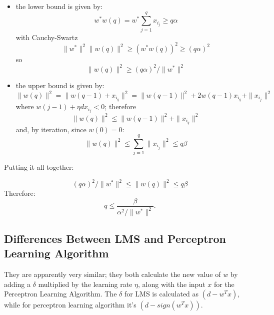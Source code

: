 \begin{itemize}
    \item the lower bound is given by:
    \begin{equation*}
        w^*w(q) = w^* \sum_{j=1}^q x_{i_j} \geq q \alpha
    \end{equation*}
    with Cauchy-Swartz
    \begin{equation*}
        \|w^*\|^2\|w(q)\|^2 \geq (w^*w(q))^2 \geq (q \alpha)^2
    \end{equation*}
    so
    \begin{equation*}
        \|w(q)\|^2 \geq (q \alpha)^2 / \|w^*\|^2
    \end{equation*}

    \item the upper bound is given by:
    \begin{equation*}
        \|w(q)\|^2 = \|w(q-1) + x_{i_q}\|^2 = \|w(q-1)\|^2 + 2w(q-1)x_{i_q} + \|x_{i_j}\|^2
    \end{equation*}
    where $w(j-1) + \eta d x_{i_j} < 0$; therefore
    \begin{equation*}
        \|w(q)\|^2 \leq \|w(q-1)\|^2 + \|x_{i_q}\|^2
    \end{equation*}
    and, by iteration, since $w(0) = 0$:
    \begin{equation*}
        \|w(q)\|^2 \leq \sum_{j=1}^q \|x_{i_j}\|^2 \leq q \beta
    \end{equation*}
    
\end{itemize}

Putting it all together:

\begin{equation*}
    (q \alpha)^2 / \|w^*\|^2 \leq \|w(q)\|^2 \leq q \beta
\end{equation*}
Therefore:
\begin{equation*}
    q \leq \dfrac{\beta}{\alpha^2 / \|w^*\|^2}.
\end{equation*}


\subsection{Differences Between LMS and Perceptron Learning Algorithm}

They are apparently very similar; they both calculate the new value of $w$ by adding a $\delta$ multiplied by the learning rate $\eta$, along with the input $x$ for the Perceptron Learning Algorithm. The $\delta$ for LMS is calculated as $(d - w^Tx)$, while for perceptron learning algorithm it's $(d - sign(w^Tx))$.

